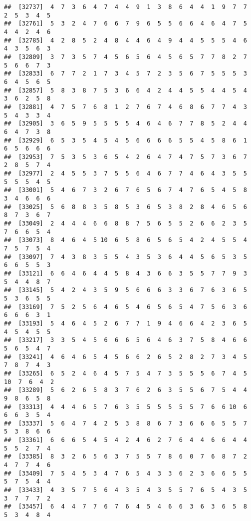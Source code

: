 \documentclass[
]{book}
\begin{document}
\begin{verbatim}
##  [32737]  4  7  3  6  4  7  4  4  9  1  3  8  6  4  4  1  9  7  7  2  5  3  4  5
##  [32761]  5  3  2  4  7  6  6  7  9  6  5  5  6  6  4  6  4  7  5  4  4  2  4  6
##  [32785]  4  2  8  5  2  4  8  4  4  6  4  9  4  4  5  5  5  4  6  4  3  5  6  3
##  [32809]  3  7  3  5  7  4  5  6  5  6  4  5  6  5  7  7  8  2  7  5  6  6  7  3
##  [32833]  6  7  7  2  1  7  3  4  5  7  2  3  5  6  7  5  5  5  3  6  4  5  6  5
##  [32857]  5  8  3  8  7  5  3  6  6  4  2  4  4  5  5  4  4  5  4  3  6  2  5  8
##  [32881]  4  7  5  7  6  8  1  2  7  6  7  4  6  8  6  7  7  4  3  5  4  3  3  4
##  [32905]  3  6  5  9  5  5  5  5  4  6  4  6  7  7  8  5  2  4  4  6  4  7  3  8
##  [32929]  6  5  3  5  4  5  4  5  6  6  6  6  5  5  4  5  8  6  1  6  5  6  6  6
##  [32953]  7  5  3  5  3  6  5  4  2  6  4  7  4  7  5  7  3  6  7  2  8  5  7  4
##  [32977]  2  4  5  5  3  7  5  5  6  4  6  7  7  4  6  4  3  5  5  5  5  5  4  5
##  [33001]  5  4  6  7  3  2  6  7  6  5  6  7  4  7  6  5  4  5  8  3  4  6  6  6
##  [33025]  5  6  8  8  3  5  8  5  3  6  5  3  8  2  8  4  6  5  6  8  7  3  6  7
##  [33049]  2  4  4  4  6  6  8  8  7  5  6  5  5  2  6  6  2  3  5  7  6  6  5  4
##  [33073]  8  4  6  4  5 10  6  5  8  6  5  6  5  4  2  4  5  5  4  7  5  7  5  4
##  [33097]  7  4  3  8  3  5  5  4  3  5  3  6  4  4  5  6  5  3  5  6  6  5  5  3
##  [33121]  6  6  4  6  4  4  5  8  4  3  6  6  3  5  5  7  7  9  3  5  4  4  8  7
##  [33145]  5  4  2  4  3  5  9  5  6  6  6  3  3  6  7  6  3  6  5  5  3  6  5  5
##  [33169]  7  5  2  5  6  4  6  5  4  6  5  6  5  4  7  5  6  3  6  6  6  6  3  1
##  [33193]  5  4  6  4  5  2  6  7  7  1  9  4  6  6  4  2  3  6  5  4  5  4  5  5
##  [33217]  3  3  5  4  5  6  6  6  5  6  4  6  3  7  5  8  4  6  6  5  6  5  4  7
##  [33241]  4  6  4  6  5  4  5  6  6  2  6  5  2  8  2  7  3  4  5  7  8  7  4  3
##  [33265]  6  5  2  4  6  4  5  7  5  4  7  3  5  5  5  6  7  4  5 10  7  6  4  2
##  [33289]  5  6  2  6  5  8  3  7  6  2  6  3  5  5  6  7  5  4  4  9  8  6  5  8
##  [33313]  4  4  4  6  5  7  6  3  5  5  5  5  5  5  7  6  6 10  6  6  6  3  5  4
##  [33337]  5  6  4  7  4  2  5  3  8  8  6  7  3  6  6  6  5  5  7  5  3  8  6  6
##  [33361]  6  6  6  5  4  5  4  2  4  6  2  7  6  4  4  6  6  4  4  5  5  2  7  4
##  [33385]  8  3  2  6  5  6  3  7  5  5  7  8  6  0  7  6  8  7  2  4  7  7  4  6
##  [33409]  7  5  4  5  3  4  7  6  5  4  3  3  6  2  3  6  6  5  5  5  7  5  4  4
##  [33433]  4  3  5  7  5  6  4  3  5  4  3  5  5  7  6  5  4  3  5  3  7  7  7  2
##  [33457]  6  4  4  7  7  6  7  6  4  5  4  6  6  3  6  3  6  5  8  5  3  4  8  4

\end{verbatim}
\end{document}
